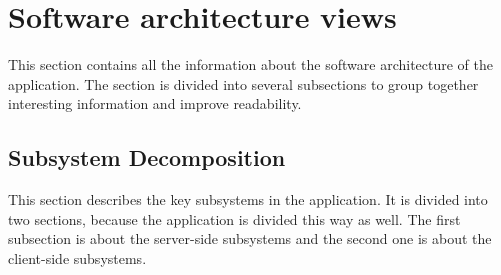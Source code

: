\documentclass{report}
\begin{document}
			
	\clearpage
	\section{Software architecture views}
		This section contains all the information about the software architecture of the application. The section is divided into several subsections to group together interesting information and improve readability.
		\subsection{Subsystem Decomposition}

		
		
			This section describes the key subsystems in the application. It is divided into two sections, because the application is divided this way as well. The first subsection is about the server-side subsystems and the second one is about the client-side subsystems.
			
\end{document}

